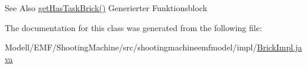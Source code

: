 \begin{DoxySeeAlso}{See Also}
\hyperlink{classshootingmachineemfmodel_1_1impl_1_1_brick_impl_a31e7ecea8f97c7c733ba4ecf8589efc5}{get\-Has\-Task\-Brick()} Generierter Funktionsblock  
\end{DoxySeeAlso}


The documentation for this class was generated from the following file\-:\begin{DoxyCompactItemize}
\item 
Modell/\-E\-M\-F/\-Shooting\-Machine/src/shootingmachineemfmodel/impl/\hyperlink{_brick_impl_8java}{Brick\-Impl.\-java}\end{DoxyCompactItemize}
